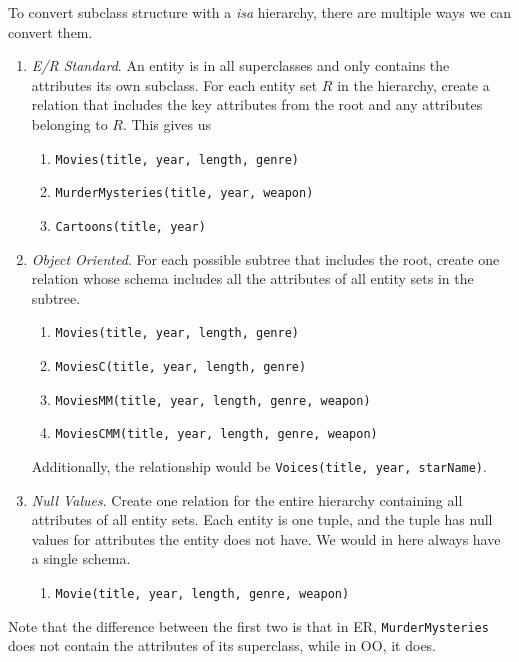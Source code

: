   \begin{theorem}
    To convert subclass structure with a \textit{isa} hierarchy, there are multiple ways we can convert them. 
    \begin{enumerate}
      \item \textit{E/R Standard}. An entity is in all superclasses and only contains the attributes its own subclass. For each entity set $R$ in the hierarchy, create a relation that includes the key attributes from the root and any attributes belonging to $R$. This gives us 
        \begin{enumerate}
          \item \texttt{Movies(title, year, length, genre)}
          \item \texttt{MurderMysteries(title, year, weapon)}
          \item \texttt{Cartoons(title, year)}
        \end{enumerate}
      \item \textit{Object Oriented}. For each possible subtree that includes the root, create one relation whose schema includes all the attributes of all entity sets in the subtree.
        \begin{enumerate}
          \item \texttt{Movies(title, year, length, genre)} 
          \item \texttt{MoviesC(title, year, length, genre)} 
          \item \texttt{MoviesMM(title, year, length, genre, weapon)}
          \item \texttt{MoviesCMM(title, year, length, genre, weapon)}
        \end{enumerate}
        Additionally, the relationship would be \texttt{Voices(title, year, starName)}. 
      \item \textit{Null Values}. Create one relation for the entire hierarchy containing all attributes of all entity sets. Each entity is one tuple, and the tuple has null values for attributes the entity does not have. We would in here always have a single schema. 
        \begin{enumerate}
          \item \texttt{Movie(title, year, length, genre, weapon)}
        \end{enumerate}
    \end{enumerate}
  \end{theorem}

  Note that the difference between the first two is that in ER, \texttt{MurderMysteries} does not contain the attributes of its superclass, while in OO, it does. 

